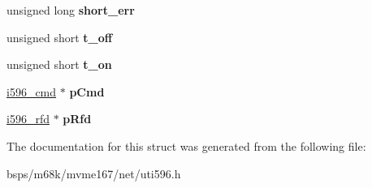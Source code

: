 \begin{DoxyCompactItemize}
unsigned long {\bfseries short\+\_\+err}
\item 
\mbox{\label{structi596__scb_ad4faa45ce7de553450c04dbcfaa1fffd}} 
unsigned short {\bfseries t\+\_\+off}
\item 
\mbox{\label{structi596__scb_a550cfc59d9a6836d7bb2f312332191d8}} 
unsigned short {\bfseries t\+\_\+on}
\item 
\mbox{\label{structi596__scb_af41ce97bb3b5690fb79c35eb5acdfa91}} 
\mbox{\hyperlink{structi596__cmd}{i596\+\_\+cmd}} $\ast$ {\bfseries p\+Cmd}
\item 
\mbox{\label{structi596__scb_aefbdc5de7c4fc84863bceff90d8928a0}} 
\mbox{\hyperlink{structi596__rfd}{i596\+\_\+rfd}} $\ast$ {\bfseries p\+Rfd}
\end{DoxyCompactItemize}


The documentation for this struct was generated from the following file\+:\begin{DoxyCompactItemize}
\item 
bsps/m68k/mvme167/net/uti596.\+h\end{DoxyCompactItemize}
